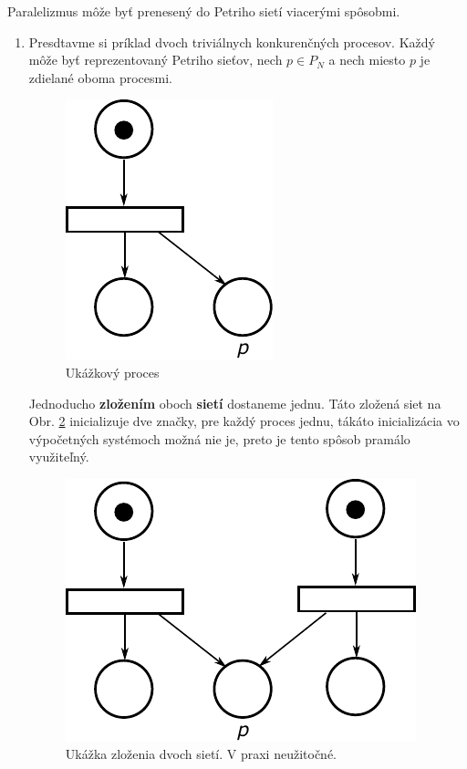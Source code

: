 Paralelizmus môže byť prenesený do Petriho sietí viacerými spôsobmi.
\begin{enumerate}
	\item Presdtavme si príklad dvoch triviálnych konkurenčných procesov. Každý môže byť reprezentovaný Petriho sieťov, nech $p \in P_N$ a nech miesto $p$ je zdielané oboma procesmi. 
	
	\begin{figure}[H]
		\label{fig:example-proc}
		\centering
		\includegraphics[scale=0.5]{obrazky-figures/PN-process1}
		\caption{Ukážkový proces}
	\end{figure}
	
	Jednoducho \textbf{zložením} oboch \textbf{sietí} dostaneme jednu. Táto zložená siet na Obr. \ref{fig:parallel-proc} inicializuje dve značky, pre každý proces jednu, tákáto inicializácia vo výpočetných systémoch možná nie je, preto je tento spôsob pramálo využiteľný.
	
	\begin{figure}[H]
		\label{fig:parallel-proc}
		\centering
		\includegraphics[scale=0.5]{obrazky-figures/PN-parallel2}
		\caption{Ukážka zloženia dvoch sietí. V praxi neužitočné.}
	\end{figure}


\end{enumerate}
